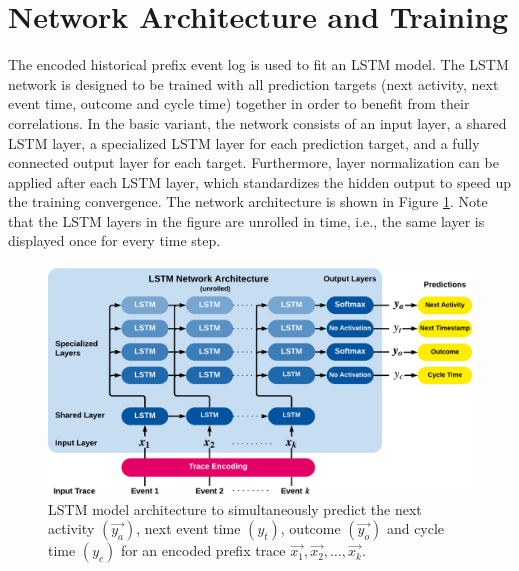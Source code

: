 \section{Network Architecture and Training}
The encoded historical prefix event log is used to fit an LSTM model.
The LSTM network is designed to be trained with all prediction targets (next activity, next event time, outcome and cycle time) together in order to benefit from their correlations.
In the basic variant, the network consists of an input layer, a shared LSTM layer, a specialized LSTM layer for each prediction target, and a fully connected output layer for each target.
Furthermore, layer normalization \cite{DBLP:journals/corr/BaKH16} can be applied after each LSTM layer, which standardizes the hidden output to speed up the training convergence.
The network architecture is shown in Figure \ref{fig:network}.
Note that the LSTM layers in the figure are unrolled in time, i.e., the same layer is displayed once for every time step.

\begin{figure}[!htbp]
	\centering
	\includegraphics[width=\textwidth]{figures/network}
	\caption[LSTM model architecture for text-aware process prediction]{LSTM model architecture to simultaneously predict the next activity $(\vec{y_a})$, next event time $(y_t)$, outcome $(\vec{y_o})$ and cycle time $(y_c)$ for an encoded prefix trace $\vec{x_1}, \vec{x_2}, \dots, \vec{x_k}$.}
	\label{fig:network}
\end{figure}

